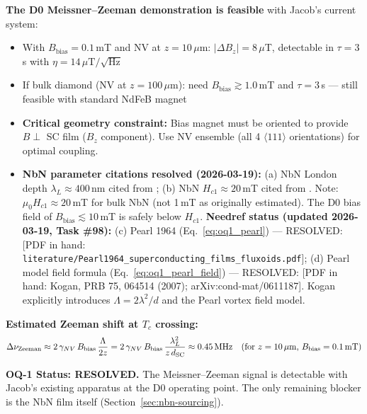 \textbf{The D0 Meissner--Zeeman demonstration is feasible} with Jacob's
current system:

\begin{itemize}
  \item With $B_\text{bias} = 0.1$\,mT and NV at $z = 10\,\mu$m:
    $|\Delta B_z| = 8\,\mu$T, detectable in $\tau = 3$\,s with $\eta = 14\,\mu\text{T}/\sqrt{\text{Hz}}$

  \item If bulk diamond (NV at $z = 100\,\mu$m): need $B_\text{bias} \gtrsim 1.0$\,mT and
    $\tau = 3$\,s --- still feasible with standard NdFeB magnet

  \item \textbf{Critical geometry constraint:} Bias magnet must be oriented
    to provide $B \perp$ SC film ($B_z$ component). Use NV ensemble (all 4
    $\langle 111 \rangle$ orientations) for optimal coupling.

  \item \textbf{NbN parameter citations resolved (2026-03-19):}
    (a) NbN London depth $\lambda_L \approx 400$\,nm cited from \cite{Kamlapure2010};
    (b) NbN $H_{c1} \approx 20$\,mT cited from \cite{Ito2019}.
    Note: $\mu_0 H_{c1} \approx 20$\,mT for bulk NbN (not 1\,mT as originally estimated).
    The D0 bias field of $B_\text{bias} \lesssim 10$\,mT is safely below $H_{c1}$.
    \textbf{Needref status (updated 2026-03-19, Task \#98):}
    (c) Pearl 1964 (Eq.~\ref{eq:oq1_pearl}) --- RESOLVED: \cite{Pearl1964} [PDF in hand:
    \texttt{literature/Pearl1964\_superconducting\_films\_fluxoids.pdf}];
    (d) Pearl model field formula (Eq.~\ref{eq:oq1_pearl_field}) --- RESOLVED: \cite{Kogan2007}
    [PDF in hand: Kogan, PRB 75, 064514 (2007); arXiv:cond-mat/0611187].
    Kogan explicitly introduces $\Lambda = 2\lambda^2/d$ and the Pearl vortex field model.
\end{itemize}

\textbf{Estimated Zeeman shift at $T_c$ crossing:}
\begin{equation}
  \Delta\nu_\text{Zeeman} \approx 2\,\gamma_{NV}\,B_\text{bias}\,\frac{\Lambda}{2z}
  = 2\,\gamma_{NV}\,B_\text{bias}\,\frac{\lambda_L^2}{z\,d_\text{SC}}
  \approx 0.45\,\text{MHz}
  \quad \text{(for $z=10\,\mu$m, $B_\text{bias} = 0.1$\,mT)}
\end{equation}

\textbf{OQ-1 Status: RESOLVED.} The Meissner--Zeeman signal is detectable with Jacob's existing
apparatus at the D0 operating point. The only remaining blocker is the NbN film itself
(Section~\ref{sec:nbn-sourcing}).
